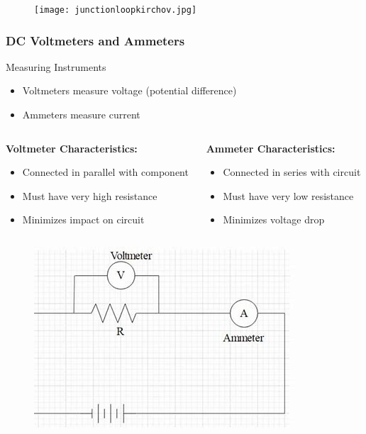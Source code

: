 \documentclass{beamer}
\begin{document}
    \begin{frame}{}
       
    \begin{figure}
        \centering
        \texttt{[image: junctionloopkirchov.jpg]}
    \end{figure}
\end{frame}

\begin{frame}
    \frametitle{DC Voltmeters and Ammeters}
    \begin{block}{Measuring Instruments}
        \begin{itemize}
            \item Voltmeters measure voltage (potential difference)
            \item Ammeters measure current
        \end{itemize}
    \end{block}
    \begin{columns}
        \begin{column}{0.5\textwidth}
            \textbf{Voltmeter Characteristics:}
            \begin{itemize}
                \item Connected in parallel with component
                \item Must have very high resistance
                \item Minimizes impact on circuit
            \end{itemize}
        \end{column}
        \begin{column}{0.5\textwidth}
            \textbf{Ammeter Characteristics:}
            \begin{itemize}
                \item Connected in series with circuit
                \item Must have very low resistance
                \item Minimizes voltage drop
            \end{itemize}
        \end{column}
    \end{columns}
    \begin{figure}
        \centering
        \includegraphics[width=0.3\linewidth]{amvolmm.jpg}
    \end{figure}
\end{frame}
\end{document}

